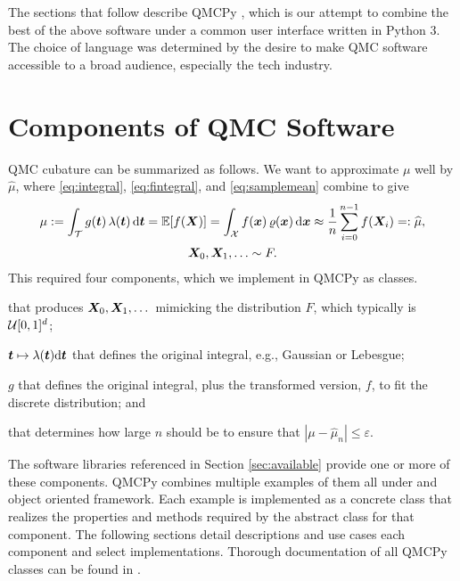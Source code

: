\documentclass[graybox,footinfo]{svmult}
\newcommand{\QMCPYabs}[1]{\ensuremath{{\left \lvert #1 \right \rvert}}}
\newcommand{\hmu}{\widehat{\mu}}
\begin{document}
The sections that follow describe QMCPy \cite{QMCPy2020a}, which is our attempt to combine the best of the above software under a common user interface written in Python 3.  The choice of language was determined by the desire to make QMC software accessible to a broad audience, especially the tech industry.


\section{Components of QMC Software}
QMC cubature can be summarized as follows.  We want to approximate $\mu$ well by $\hmu$, where \eqref{eq:integral}, \eqref{eq:fintegral}, and \eqref{eq:samplemean} combine to give
\begin{multline} \label{eq:cubSummary}
	\mu : = \int_\calT g(\bst) \, \lambda(\bst) \, \D \bst  = \bbE[f(\bsX)] = \int_\calX f(\bsx) \, \varrho(\bsx) \, \D \bsx \approx \frac 1n \sum_{i=0}^{n-1} f(\bsX_i) =: \hmu, \\
	 \bsX_0, \bsX_1, \ldots \sim F.
\end{multline}
This required four components, which we implement in QMCPy as classes.

\begin{description}[format=\textup,format=\textbf]
	
	\item[Discrete Distribution] that produces ${\boldsymbol{X}}_0, {\boldsymbol{X}}_1, \dots$ mimicking the distribution $F$, which typically is ${\mathcal{U}}[0,1]^d$;
	
	\item[True Measure] ${\boldsymbol{t}} \mapsto \lambda ({\boldsymbol{t}}) \mathrm{d} {\boldsymbol{t}}$ that defines the original integral, e.g., Gaussian or Lebesgue;
	
	\item[Integrand] $g$ that  defines the original integral, plus the transformed version, $f$, to fit the discrete distribution; and
	
	\item[Stopping Criterion] that determines how large $n$ should be to ensure that $\QMCPYabs{\mu - \hmu_n} \le \varepsilon$.
\end{description}

The software libraries referenced in Section \ref{sec:available} provide one or more of these components.  QMCPy combines multiple examples of them all under and object oriented framework. Each example is implemented as a concrete class that realizes the properties and methods required by the abstract class for that component. The following sections detail descriptions and use cases each component and select implementations. Thorough documentation of all QMCPy classes can be found in \cite{QMCPyDocs}. 
\end{document}

